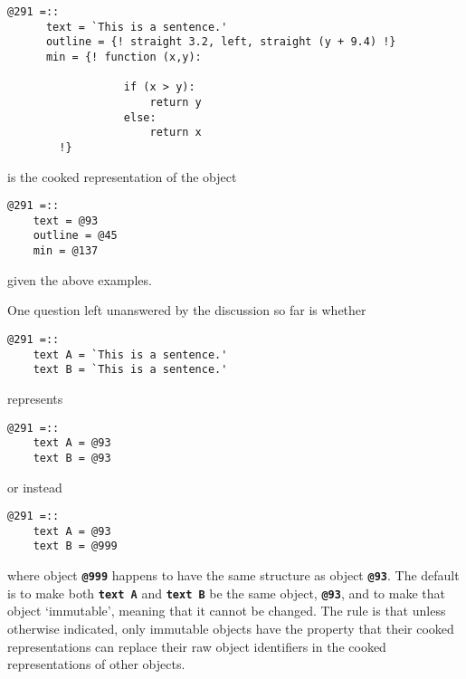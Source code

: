\documentclass[12pt]{article}
\newcommand{\TT}[1]{{\tt \bfseries #1}}
\newenvironment{indpar}[1][0.3in]%
	{\begin{list}{}%
		     {\setlength{\itemsep}{0in}%
		      \setlength{\topsep}{0in}%
		      \setlength{\parsep}{1ex}%
		      \setlength{\labelwidth}{#1}%
		      \setlength{\leftmargin}{#1}%
		      \addtolength{\leftmargin}{\labelsep}}%
	 \item}%
	{\end{list}}
\begin{document}
\begin{indpar}\begin{verbatim}
@291 =::
      text = `This is a sentence.'
      outline = {! straight 3.2, left, straight (y + 9.4) !}
      min = {! function (x,y):

                  if (x > y):
                      return y
                  else:
                      return x
	    !}
\end{verbatim}\end{indpar}

is the cooked representation of the object

\begin{indpar}\begin{verbatim}
@291 =::
    text = @93
    outline = @45
    min = @137
\end{verbatim}\end{indpar}

given the above examples.

One question left unanswered by the discussion so far is whether

\begin{indpar}\begin{verbatim}
@291 =::
    text A = `This is a sentence.'
    text B = `This is a sentence.'
\end{verbatim}\end{indpar}

represents

\begin{indpar}\begin{verbatim}
@291 =::
    text A = @93
    text B = @93
\end{verbatim}\end{indpar}

or instead

\begin{indpar}\begin{verbatim}
@291 =::
    text A = @93
    text B = @999
\end{verbatim}\end{indpar}

where object \TT{@999} happens to have the same structure as
object \TT{@93}.  The default is to make both \TT{text A}
and \TT{text B} be the same object, \TT{@93}, and to make
that object `immutable', meaning that it cannot be changed.  The
rule is that unless otherwise indicated, only immutable objects
have the property that their cooked representations can replace
their raw object identifiers in the cooked representations of other
objects.
\end{document}
